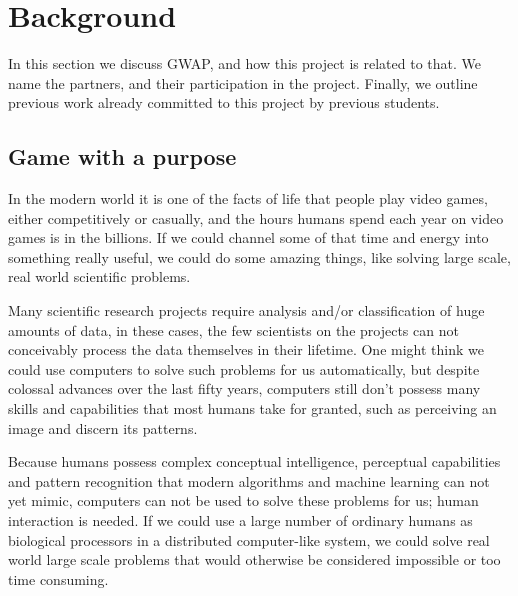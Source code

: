 \section{Background}\label{sec:background}
In this section we discuss GWAP\cite{GWAP}, and how this project is related to that. We name the partners, and their participation in the project. Finally, we outline previous work already committed to this project by previous students.

\subsection{Game with a purpose}
In the modern world it is one of the facts of life that people play video games, either competitively or casually, and the hours humans 
spend each year on video games is in the billions. If we could channel some of that time and energy into 
something really useful, we could do some amazing things, like solving large scale, real world scientific problems.

Many scientific research projects require analysis and/or 
classification of huge amounts of data, in these cases, the few scientists on the projects can not conceivably process the data themselves in their lifetime. One might think we could use computers to solve such problems for us automatically, but despite colossal advances over the last fifty years, computers still don't possess many skills and capabilities that most humans take for granted, such as perceiving an image and discern its patterns.

Because humans possess complex conceptual intelligence, perceptual capabilities and pattern recognition that modern algorithms and machine learning can not yet mimic, computers can not be used to solve these problems for us; human interaction is needed. If we could use a large number of ordinary humans as biological processors in a distributed computer-like system, we could solve real world large scale problems that would otherwise be considered impossible or too time consuming.

